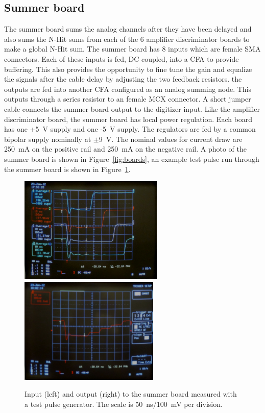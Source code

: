 \documentclass[pdftex]{JINST}
\begin{document}
\subsection{Summer board}
\label{sec:Sum}
%
The summer board sums the analog channels after they have been
delayed and also sums the N-Hit sums from each of the 6 amplifier discriminator boards to make
a global N-Hit sum. The summer board has 8 inputs which are female
SMA connectors. Each of these inputs is fed, DC coupled, into a CFA
to provide buffering. This also provides the opportunity to fine tune
the gain and equalize the signals after the cable delay by adjusting
the two feedback resistors. the outputs are fed into another CFA
configured as an analog summing node. This outputs through a series
resistor to an female MCX connector. A short jumper cable connects
the summer board output to the digitizer input. Like the amplifier
discriminator board, the summer board has local power regulation.
Each board has one +5~V supply and one -5~V supply. The regulators are
fed by a common bipolar supply nominally at $\pm$9~V.
The nominal values for current draw are 250~mA on the positive
rail and 250~mA on the negative rail. A photo of the summer
board is shown in Figure~\ref{fig:boards}, an example test pulse run
through the summer board is shown in Figure~\ref{fig:summerpulse}.

\begin{figure}[ht]
	\begin{center}
		\includegraphics[height=2in, keepaspectratio=true]{graphics/sumpulseinput.jpg}
		\includegraphics[height=2in, keepaspectratio=true]{graphics/sumpulseoutput.jpg}
		\caption{Input (left) and output (right) to the summer board measured with a test pulse generator.  The scale is 50~ns/100~mV per division.
		\label{fig:summerpulse}}
	\end{center}
\end{figure}
\end{document}

